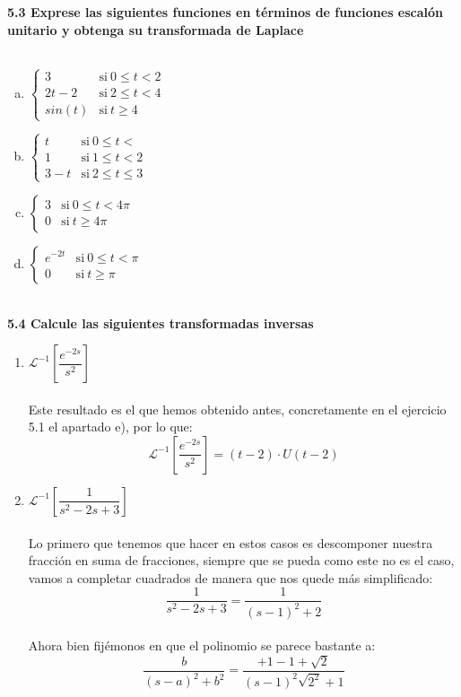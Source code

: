 \documentclass[11pt]{article}
\def\Laplace#1{\mathscr{L}}%
\begin{document}
\textbf{5.3 Exprese las siguientes funciones en términos de funciones escalón unitario y obtenga su transformada de Laplace \\ \\}
\begin{enumerate}[(a)]
\item  $\left\{
	       \begin{array}{ll}
		 3      & \mathrm{si\ }  0\leq t <2\\
		 2t-2 & \mathrm{si\ }   2\leq t <4\\
		sin(t) & \mathrm{si\ }  t\geq 4
	       \end{array}\right.$ \\
\item  $\left\{
	       \begin{array}{ll}
		 t      & \mathrm{si\ }  0\leq t <\\
		 1 & \mathrm{si\ }   1\leq t <2\\
		3-t & \mathrm{si\ }  2 \leq t\leq 3
	       \end{array}\right.$ \\
\item  $\left\{
	       \begin{array}{ll}
		 3      & \mathrm{si\ }  0\leq t <4\pi\\
		 0 		& \mathrm{si\ }  t\geq 4\pi
	
	       \end{array}\right.$
\item  $\left\{
	       \begin{array}{ll}
		e^{-2t}      & \mathrm{si\ }  0\leq t <\pi\\
		 0 		& \mathrm{si\ }  t\geq \pi
	
	       \end{array}\right.$
	      \\ \\
\end{enumerate}
\textbf{5.4 Calcule las siguientes transformadas inversas}
\begin{enumerate}[(i.)]
\item $\Laplace[^{-1}\left[\dfrac{e^{-2s}}{s^2}\right]$ \\
\\ Este resultado es el que hemos obtenido antes, concretamente en el ejercicio 5.1 el apartado e), por lo que:
$$\Laplace[^{-1}\left[\dfrac{e^{-2s}}{s^2}\right]=(t-2)\cdot U(t-2)$$
\item $\Laplace[^{-1}\left[\dfrac{1}{s^2-2s +3 }\right]$ \\ \\
Lo primero que tenemos que hacer en estos casos es descomponer nuestra fracción en suma de fracciones, siempre que se pueda como este no es el caso, vamos a completar cuadrados de manera que nos quede más simplificado:
$$\dfrac{1}{s^2-2s+3}=\dfrac{1}{(s-1)^2+2}$$
\\ Ahora bien fijémonos en que el polinomio se parece bastante a:
$$\dfrac{b}{(s-a)^2+b^2}= \dfrac{ +1-1+\sqrt{2}}{(s-1)^2\sqrt{2^2}+1}$$
\end{enumerate}
\end{document}
